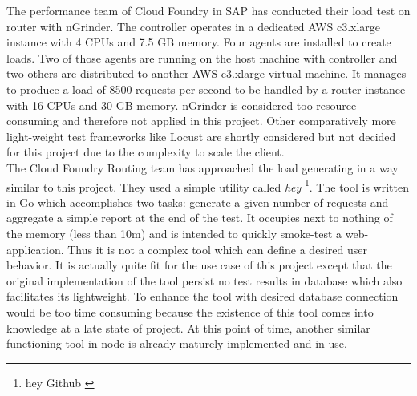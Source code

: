 The performance team of Cloud Foundry in SAP has conducted their load test on router with nGrinder. The controller operates in a dedicated AWS c3.xlarge instance with 4 CPUs and 7.5 GB memory. Four agents are installed to create loads. Two of those agents are running on the host machine with controller and two others are distributed to another AWS c3.xlarge virtual machine. It manages to produce a load of 8500 requests per second to be handled by a router instance with 16 CPUs and 30 GB memory. nGrinder is considered too resource consuming and therefore not applied in this project. Other comparatively more light-weight test frameworks like Locust are shortly considered but not decided for this project due to the complexity to scale the client.\\
The Cloud Foundry Routing team has approached the load generating in a way similar to this project. They used a simple utility called \textit{hey} \footnote{hey Github \cite{Hey}}. The tool is written in Go which accomplishes two tasks: generate a given number of requests and aggregate a simple report at the end of the test. It occupies next to nothing of the memory (less than 10m) and is intended to quickly smoke-test a web-application. Thus it is not a complex tool which can define a desired user behavior. It is actually quite fit for the use case of this project except that the original implementation of the tool persist no test results in database which also facilitates its lightweight. To enhance the tool with desired database connection would be too time consuming because the existence of this tool comes into knowledge at a late state of project. At this point of time, another similar functioning tool in node is already maturely implemented and in use.\\    




  
